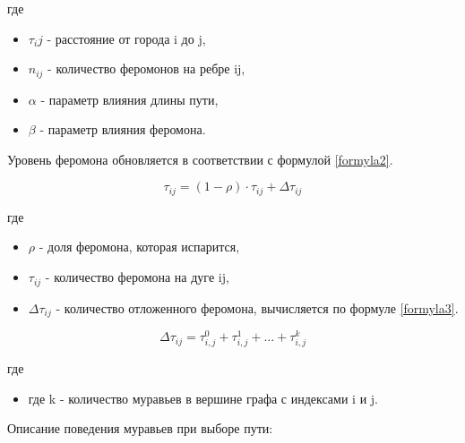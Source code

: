 где
\begin{itemize}
  \item $\tau_ij$ - расстояние от города i до j, 
  \item $n_{ij}$ - количество феромонов на ребре ij,
  \item $\alpha$ - параметр влияния длины пути,
  \item $\beta$ - параметр влияния феромона.
\end{itemize}

Уровень феромона обновляется в соответствии с формулой  \ref{formyla2}.

\begin{equation}\label{formyla2}
  \tau_{ij} = (1-\rho)\cdot \tau_{ij} + \Delta \tau_{ij}
\end{equation}

где
\begin{itemize}
  \item $\rho$ - доля феромона, которая испарится, 
  \item $\tau_{ij}$ - количество феромона на дуге ij,
  \item $\Delta\tau_{ij}$ - количество отложенного феромона, вычисляется по формуле  \ref{formyla3}.
\end{itemize}


\begin{equation}\label{formyla3}
  \Delta\tau_{ij} = \tau_{i,j}^{0} + \tau_{i,j}^{1} + ... + \tau_{i,j}^{k}
\end{equation}

где
\begin{itemize}
  \item где k - количество муравьев в вершине графа с индексами i и j.
\end{itemize}

Описание поведения муравьев при выборе пути:

